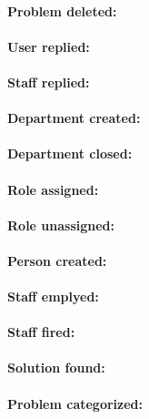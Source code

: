 \paragraph{Problem deleted:}

\paragraph{User replied:}

\paragraph{Staff replied:}

\paragraph{Department created:}

\paragraph{Department closed:}

\paragraph{Role assigned:}

\paragraph{Role unassigned:}

\paragraph{Person created:}

\paragraph{Staff emplyed:}

\paragraph{Staff fired:}

\paragraph{Solution found:}

\paragraph{Problem categorized:}


